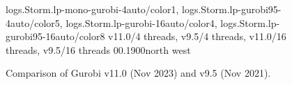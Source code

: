 
\begin{figure*}[!htp]
	\centering
	{
logs.Storm.lp-mono-gurobi-4auto/color1,
logs.Storm.lp-gurobi95-4auto/color5,
logs.Storm.lp-gurobi-16auto/color4,
logs.Storm.lp-gurobi95-16auto/color8
}
	{v11.0/4 threads, v9.5/4 threads, v11.0/16 threads, v9.5/16 threads}
	{0}{\numcommunity}{0.1}{900}{north west}
	\caption{Comparison of Gurobi v11.0 (Nov 2023) and v9.5 (Nov 2021).}
	\label{fig:LP-version}
\end{figure*}